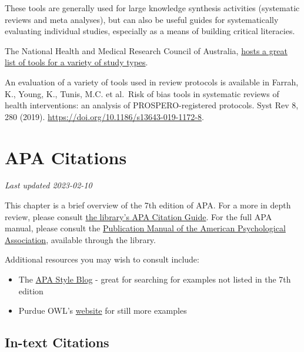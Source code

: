 \documentclass[
]{book}
\providecommand{\tightlist}{%
  \setlength{\itemsep}{0pt}\setlength{\parskip}{0pt}}
\begin{document}
These tools are generally used for large knowledge synthesis activities (systematic reviews and meta analyses), but can also be useful guides for systematically evaluating individual studies, especially as a means of building critical literacies.

The National Health and Medical Research Council of Australia, \href{https://www.nhmrc.gov.au/guidelinesforguidelines/develop/assessing-risk-bias}{hosts a great list of tools for a variety of study types}.

An evaluation of a variety of tools used in review protocols is available in Farrah, K., Young, K., Tunis, M.C. et al.~Risk of bias tools in systematic reviews of health interventions: an analysis of PROSPERO-registered protocols. Syst Rev 8, 280 (2019). \url{https://doi.org/10.1186/s13643-019-1172-8}.

\hypertarget{apa-citations-1}{%
\chapter{APA Citations}\label{apa-citations-1}}

\emph{Last updated 2023-02-10}

This chapter is a brief overview of the 7th edition of APA. For a more in depth review, please consult \href{https://guides.library.ubc.ca/apacitationstyle}{the library's APA Citation Guide}. For the full APA manual, please consult the \href{http://resolve.library.ubc.ca/cgi-bin/catsearch?bid=10057275}{Publication Manual of the American Psychological Association}, available through the library.

Additional resources you may wish to consult include:

\begin{itemize}
\tightlist
\item
  The \href{https://apastyle.apa.org/blog/}{APA Style Blog} - great for searching for examples not listed in the 7th edition
\item
  Purdue OWL's \href{https://owl.purdue.edu/owl/research_and_citation/apa_style/apa_formatting_and_style_guide/general_format.html}{website} for still more examples
\end{itemize}

\hypertarget{in-text-citations-1}{%
\section{In-text Citations}\label{in-text-citations-1}}
\end{document}
